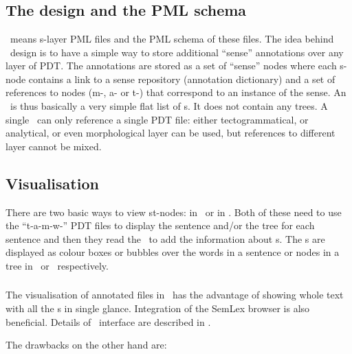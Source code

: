 \section{\sdata}
\subsection{The design and the PML schema}
\sdata\ means s-layer PML files and the PML schema of these files. The idea behind \sdata\ design is to have a simple way to store additional ``sense'' annotations over any layer of PDT. The annotations are stored as a set of ``sense'' nodes where each s-node contains a link to a sense repository (annotation dictionary) and a set of references to nodes (m-, a- or t-) that correspond to an instance of the sense. An \sf\ is thus basically a very simple flat list of \sn{}s. It does not contain any trees. A single \sf\ can only reference a single PDT file: either tectogrammatical, or analytical, or even morphological layer can be used, but references to different layer cannot be mixed.

\subsection{Visualisation}
There are two basic ways to view st-nodes: in \seman\ or in \tred. Both of these need to use the ``t-a-m-w-'' PDT files to display the sentence and/or the tree for each sentence and then they read the \stf\ to add the information about \stn{}s. The \stn{}s are displayed as colour boxes or bubbles over the words in a sentence or nodes in a tree in \seman\ or \tred\ respectively.

\subsubsection{\seman}
The visualisation of annotated files in \seman\ has the advantage of showing whole text with all the \mwe{}s in single glance. Integration of the SemLex browser is also beneficial. Details of \seman\ interface are described in . 

The drawbacks on the other hand are:

